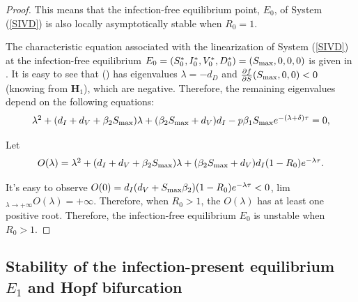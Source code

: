 \documentclass{CMHPhD-SIVD}
\begin{document}
\begin{proof}
This means that the infection-free equilibrium point, $E_0$, of System (\ref{SIVD}) is also locally asymptotically stable when $R_0=1$.

The characteristic equation associated with the linearization of System (\ref{SIVD}) at the infection-free equilibrium $E_0=(S_0^*,I_0^*,V_0^*,D_0^*)=(S_{\text{max}},0,0,0)$ is given in . 
It is easy to see that () has eigenvalues $\lambda=-d_D$ and $\frac{\partial f }{\partial S}(S_{\text{max}}, 0, 0)<0$ (knowing from $\mathbf{H}_1$), which are negative.
Therefore, the remaining eigenvalues depend on the following equations:
\begin{equation}\label{5}
   \begin{array}{ll}
    \lambda^2+(d_I+d_V+\beta_2 S_{\text{max}})\lambda+(\beta_2 S_{\text{max}}+d_V)d_I-p\beta_1 S_{\text{max}} e^{-(\lambda+\delta)\tau}=0,
   \end{array}
\end{equation}

Let
\begin{equation}\label{15}
   \begin{array}{ll}
    O(\lambda)=\lambda^2+(d_I+d_V+\beta_2 S_{\text{max}})\lambda+(\beta_2 S_{\text{max}}+d_V)d_I(1-R_0)e^{-\lambda \tau}.
   \end{array}
\end{equation}

It's easy to observe $O(0)=d_{I}(d_{V}+S_{\text{max}} \beta_2)(1-R_0)e^{-\lambda \tau}<0$, lim$_{\lambda\rightarrow+\infty}O(\lambda)=+\infty$. Therefore, when $R_0>1$, the $O(\lambda)$ has at least one positive root. Therefore, the infection-free equilibrium $E_0$ is unstable when $R_0>1$.


\end{proof}



\subsection{Stability of the infection-present equilibrium $E_1$ and Hopf bifurcation}\label{3.3}
\end{document}
